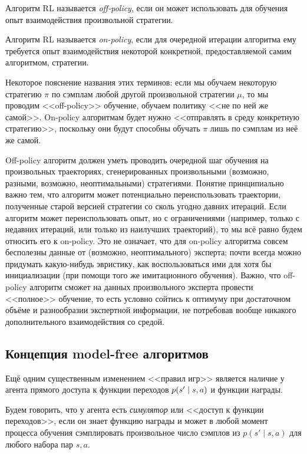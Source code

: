 \begin{definition}
Алгоритм RL называется \emph{off-policy}, если он может использовать для обучения опыт взаимодействия произвольной стратегии.
\end{definition}

\begin{definition}
Алгоритм RL называется \emph{on-policy}, если для очередной итерации алгоритма ему требуется опыт взаимодействия некоторой конкретной, предоставляемой самим алгоритмом, стратегии.
\end{definition}

Некоторое пояснение названия этих терминов: если мы обучаем некоторую стратегию $\pi$ по сэмплам любой другой произвольной стратегии $\mu$, то мы проводим <<off-policy>> обучение, обучаем политику <<не по ней же самой>>. On-policy алгоритмам будет нужно <<отправлять в среду конкретную стратегию>>, поскольку они будут способны обучать $\pi$ лишь по сэмплам из неё же самой.

Off-policy алгоритм должен уметь проводить очередной шаг обучения на произвольных траекториях, сгенерированных произвольными (возможно, разными, возможно, неоптимальными) стратегиями. Понятие принципиально важно тем, что алгоритм может потенциально переиспользовать траектории, полученные старой версией стратегии со сколь угодно давних итераций. Если алгоритм может переиспользовать опыт, но с ограничениями (например, только с недавних итераций, или только из наилучших траекторий), то мы всё равно будем относить его к on-policy. Это не означает, что для on-policy алгоритма совсем бесполезны данные от (возможно, неоптимального) эксперта; почти всегда можно придумать какую-нибудь эвристику, как воспользоваться ими для хотя бы инициализации (при помощи того же имитационного обучения). Важно, что off-policy алгоритм сможет на данных произвольного эксперта провести <<полное>> обучение, то есть условно сойтись к оптимуму при достаточном объёме и разнообразии экспертной информации, не потребовав вообще никакого дополнительного взаимодействия со средой. 

\subsection{Концепция model-free алгоритмов}

Ещё одним существенным изменением <<правил игр>> является наличие у агента прямого доступа к функции переходов $p(s' \HM\mid s, a)$ и функции награды.

\begin{definition}
Будем говорить, что у агента есть \emph{симулятор} или <<доступ к функции переходов>>, если он знает функцию награды и может в любой момент процесса обучения сэмплировать произвольное число сэмплов из $p(s' \mid s, a)$ для любого набора пар $s, a$.
\end{definition}


